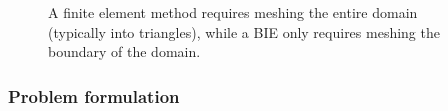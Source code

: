 %
\begin{figure}
  \caption{\label{fig:fem_vs_bie} \footnotesize A finite element method
  requires meshing the entire domain (typically into triangles), while a
  BIE only requires meshing the boundary of the domain.}
\end{figure}

\subsubsection{Problem formulation}


